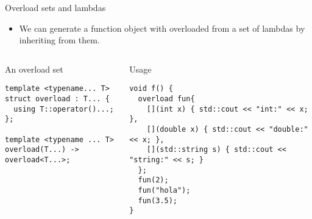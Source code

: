 \begin{frame}[t,fragile]{Overload sets and lambdas}
\begin{itemize}
  \item We can generate a function object with overloaded 
        from a set of lambdas by inheriting from them.
\end{itemize}

\begin{columns}[T]

\begin{block}{An overload set}
\begin{lstlisting}
template <typename... T>
struct overload : T... {
  using T::operator()...;
};

template <typename ... T>
overload(T...) -> overload<T...>;
\end{lstlisting}
\end{block}

\pause
{}
\begin{block}{Usage}
\begin{lstlisting}
void f() {
  overload fun{
    [](int x) { std::cout << "int:" << x; },
    [](double x) { std::cout << "double:" << x; },
    [](std::string s) { std::cout << "string:" << s; }
  };
  fun(2);
  fun("hola");
  fun(3.5);
}

\end{lstlisting}
\end{block}

\end{columns}
\end{frame}
